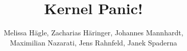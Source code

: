 \documentclass[version = 3.00]{scrreprt}
\newif\iffinal
\begin{document}
\title{Kernel Panic!}
\author{%
  Melissa Hägle,
  Zacharias Häringer,
  Johannes Mannhardt,\\
  Maximilian Nazarati,
  Jens Rahnfeld,
  Janek Spaderna}
\subject{Gruppe 09}
\publishers{Tutor: Daniel Lux}
\maketitle

\tableofcontents


\iffinal
\else
  \listoftodos
  \todototoc

  \vspace{2cm minus 1.5cm}
  \vspace{1.5ex}
  \vspace{1.5ex}
\fi












\end{document}
